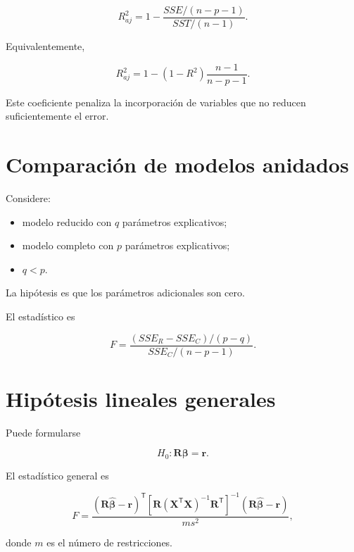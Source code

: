 \documentclass[
  spanish,
  10.5pt,
  letterpaper,
  DIV=11,
  numbers=noendperiod,
  oneside,
  open=any]{scrreprt}
\providecommand{\tightlist}{%
  \setlength{\itemsep}{0pt}\setlength{\parskip}{0pt}}
\theoremstyle{definition}
\theoremstyle{definition}
\theoremstyle{plain}
\theoremstyle{remark}
\begin{document}

\[
R^2_{aj}
=
1-
\frac{
SSE/(n-p-1)
}{
SST/(n-1)
}.
\]

Equivalentemente,

\[
R^2_{aj}
=
1-
(1-R^2)
\frac{
n-1
}{
n-p-1
}.
\]

Este coeficiente penaliza la incorporación de variables que no reducen
suficientemente el error.

\section*{Comparación de modelos
anidados}\label{comparaciuxf3n-de-modelos-anidados}


Considere:

\begin{itemize}
\tightlist
\item
  modelo reducido con \(q\) parámetros explicativos;
\item
  modelo completo con \(p\) parámetros explicativos;
\item
  \(q<p\).
\end{itemize}

La hipótesis es que los parámetros adicionales son cero.

El estadístico es

\[
F
=
\frac{
(SSE_R-SSE_C)/(p-q)
}{
SSE_C/(n-p-1)
}.
\]

\section*{Hipótesis lineales
generales}\label{hipuxf3tesis-lineales-generales}


Puede formularse

\[
H_0:
\mathbf{R}\boldsymbol{\beta}
=
\mathbf{r}.
\]

El estadístico general es

\[
F
=
\frac{
(\mathbf{R}\widehat{\boldsymbol{\beta}}-\mathbf{r})^{\mathsf T}
\left[
\mathbf{R}
(\mathbf{X}^{\mathsf T}\mathbf{X})^{-1}
\mathbf{R}^{\mathsf T}
\right]^{-1}
(\mathbf{R}\widehat{\boldsymbol{\beta}}-\mathbf{r})
}{
m s^2
},
\]

donde \(m\) es el número de restricciones.
\end{document}
